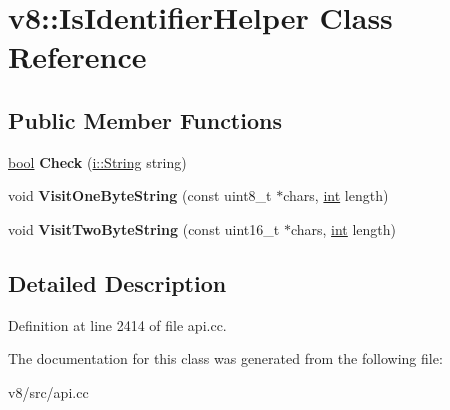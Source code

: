 \hypertarget{classv8_1_1IsIdentifierHelper}{}\section{v8\+:\+:Is\+Identifier\+Helper Class Reference}
\label{classv8_1_1IsIdentifierHelper}
\subsection*{Public Member Functions}
\begin{DoxyCompactItemize}
\item 
\mbox{\label{classv8_1_1IsIdentifierHelper_a07acce652cbf0cbbb89e6bac154a59b3}} 
\mbox{\hyperlink{classbool}{bool}} {\bfseries Check} (\mbox{\hyperlink{classv8_1_1internal_1_1String}{i\+::\+String}} string)
\item 
\mbox{\label{classv8_1_1IsIdentifierHelper_aca716548f5a3d5488085fd813c64ed2d}} 
void {\bfseries Visit\+One\+Byte\+String} (const uint8\+\_\+t $\ast$chars, \mbox{\hyperlink{classint}{int}} length)
\item 
\mbox{\label{classv8_1_1IsIdentifierHelper_ae3661f5f0b52ac7040ebb990f23b8b17}} 
void {\bfseries Visit\+Two\+Byte\+String} (const uint16\+\_\+t $\ast$chars, \mbox{\hyperlink{classint}{int}} length)
\end{DoxyCompactItemize}


\subsection{Detailed Description}


Definition at line 2414 of file api.\+cc.



The documentation for this class was generated from the following file\+:\begin{DoxyCompactItemize}
\item 
v8/src/api.\+cc\end{DoxyCompactItemize}
